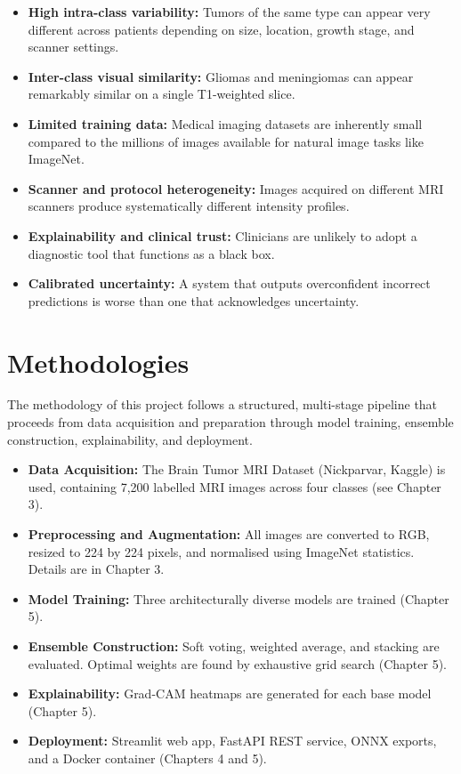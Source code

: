 \documentclass[12pt,a4paper,oneside]{report}
\begin{document}
\begin{itemize}[leftmargin=*]
  \item \textbf{High intra-class variability:} Tumors of the same type can appear very different across patients depending on size, location, growth stage, and scanner settings.
  \item \textbf{Inter-class visual similarity:} Gliomas and meningiomas can appear remarkably similar on a single T1-weighted slice.
  \item \textbf{Limited training data:} Medical imaging datasets are inherently small compared to the millions of images available for natural image tasks like ImageNet.
  \item \textbf{Scanner and protocol heterogeneity:} Images acquired on different MRI scanners produce systematically different intensity profiles.
  \item \textbf{Explainability and clinical trust:} Clinicians are unlikely to adopt a diagnostic tool that functions as a black box.
  \item \textbf{Calibrated uncertainty:} A system that outputs overconfident incorrect predictions is worse than one that acknowledges uncertainty.
\end{itemize}

\section{Methodologies}

The methodology of this project follows a structured, multi-stage pipeline that proceeds from data acquisition and preparation through model training, ensemble construction, explainability, and deployment.

\begin{itemize}[leftmargin=*]
  \item \textbf{Data Acquisition:} The Brain Tumor MRI Dataset (Nickparvar, Kaggle) is used, containing 7,200 labelled MRI images across four classes (see Chapter 3).
  \item \textbf{Preprocessing and Augmentation:} All images are converted to RGB, resized to 224 by 224 pixels, and normalised using ImageNet statistics. Details are in Chapter 3.
  \item \textbf{Model Training:} Three architecturally diverse models are trained (Chapter 5).
  \item \textbf{Ensemble Construction:} Soft voting, weighted average, and stacking are evaluated. Optimal weights are found by exhaustive grid search (Chapter 5).
  \item \textbf{Explainability:} Grad-CAM heatmaps are generated for each base model (Chapter 5).
  \item \textbf{Deployment:} Streamlit web app, FastAPI REST service, ONNX exports, and a Docker container (Chapters 4 and 5).
\end{itemize}
\end{document}
